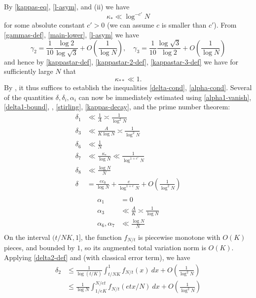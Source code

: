 \documentclass[10pt,a4paper,reqno]{amsart}
\numberwithin{equation}{section}
\theoremstyle{plain}
\theoremstyle{definition}
\begin{document}
By \eqref{kappas-eq}, \eqref{l-asym}, and (ii) we have
\begin{equation}\label{kappas-decay} 
  \kappa_* \ll \log^{-c'} N
\end{equation}
for some absolute constant $c'>0$ (we can assume $c$ is smaller than $c'$).  From \eqref{gammas-def}, \eqref{main-lower}, \eqref{l-asym} we have
$$ \gamma_2 = \frac{1}{10} \frac{\log 2}{\log \sqrt{3}} + O\left(\frac{1}{\log N}\right), \quad
 \gamma_3 = \frac{1}{10} \frac{\log \sqrt{3}}{\log 2} + O\left(\frac{1}{\log N}\right)
$$
and hence by \eqref{kappastar-def},  \eqref{kappastar-2-def}, \eqref{kappastar-3-def} we have for sufficiently large $N$ that
$$ \kappa_{**} \ll 1.$$
By , it thus suffices to establish the inequalities \eqref{delta-cond}, \eqref{alpha-cond}.
Several of the quantities $\delta, \delta_i, \alpha_i$ can now be immediately estimated using \eqref{alpha1-vanish}, \eqref{delta1-bound}, , \eqref{stirling}, \eqref{kappas-decay}, and the prime number theorem:
\begin{align*}
  \delta_1 &\ll \frac{1}{A} \asymp \frac{1}{\log^2 N} \\
  \delta_3 &\ll \frac{A}{K \log N} \asymp \frac{1}{\log^2 N} \\
  \delta_6 &\ll \frac{1}{N} \\
  \delta_7 &\ll \frac{\kappa_*}{\log N} \ll \frac{1}{\log^{1+c'} N} \\
  \delta_8 &\ll \frac{\log N}{N} \\
  \delta &= \frac{ec_0}{\log N} + \frac{e}{\log^{1+c} N} + O\left( \frac{1}{\log^2 N} \right)\\  
\end{align*}
\begin{align*}
  \alpha_1 &= 0 \\
  \alpha_3 &\ll \frac{A}{K} \asymp \frac{1}{\log N} \\
  \alpha_6, \alpha_7 &\ll \frac{\log N}{N} \\
\end{align*}
On the interval $(t/NK,1]$, the function $f_{N/t}$ is piecewise monotone with $O(K)$ pieces, and bounded by $1$, so its augmented total variation norm is $O(K)$.  Applying \eqref{delta2-def} and  (with classical error term), we have
\begin{align*}
\delta_2 &\leq \frac{1}{\log(t/K)} \int_{t/NK}^1 f_{N/t}(x)\ dx + O\left( \frac{1}{\log^2 N} \right) \\
&\leq \frac{1}{\log N} \int_{1/eK}^{N/et} f_{N/t}(etx/N)\ dx + O\left( \frac{1}{\log^2 N} \right)
\end{align*}
\end{document}
